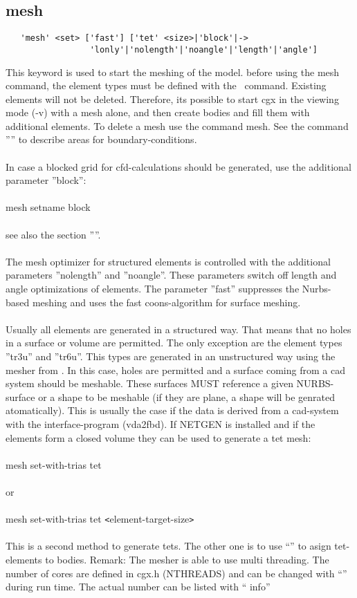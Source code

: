 \documentclass{article}
\begin{document}
\subsection{\label{mesh}mesh}
\begin{verbatim}
   'mesh' <set> ['fast'] ['tet' <size>|'block'|->
                 'lonly'|'nolength'|'noangle'|'length'|'angle']
\end{verbatim}
This keyword is used to start the meshing of the model. before using the mesh command, the element types must be defined with the \ command.  Existing elements will not be deleted. Therefore, its possible to start cgx in the viewing mode (-v) with a mesh alone, and then create bodies and fill them with additional elements. To delete a mesh use the command  mesh. See the command '''' to describe areas for boundary-conditions. 
\\\\In case a blocked grid for cfd-calculations should be generated, use the additional parameter ''block'':
\\\\mesh setname block\\\\ see also the section ''''.
\\\\The mesh optimizer for structured elements is controlled with the additional parameters ''nolength'' and ''noangle''. These parameters switch off length and angle optimizations of elements. The parameter ''fast'' suppresses the Nurbs-based meshing and uses the fast coons-algorithm for surface meshing.
\\\\Usually all elements are generated in a structured way. That means that no holes in a surface or volume are permitted. The only exception are the element types ''tr3u'' and ''tr6u''. This types are generated in an unstructured way using the mesher from \cite{mesh2d}. In this case, holes are permitted and a surface coming from a cad system should be meshable. These surfaces MUST reference a given NURBS-surface or a shape to be meshable (if they are plane, a shape will be genrated atomatically). This is usually the case if the data is derived from a cad-system with the interface-program (vda2fbd). If NETGEN \cite{NETGEN} is installed and if the elements form a closed volume they can be used to generate a tet mesh:\\\\mesh set-with-trias tet\\\\or\\\\mesh set-with-trias tet \verb_<_element-target-size\verb_>_\\\\This is a second method to generate tets. The other one is to use ``'' to asign tet-elements to bodies. Remark: The mesher is able to use multi threading. The number of cores are defined in cgx.h (NTHREADS) and can be changed with ``'' during run time. The actual number can be listed with `` info''
\end{document}
